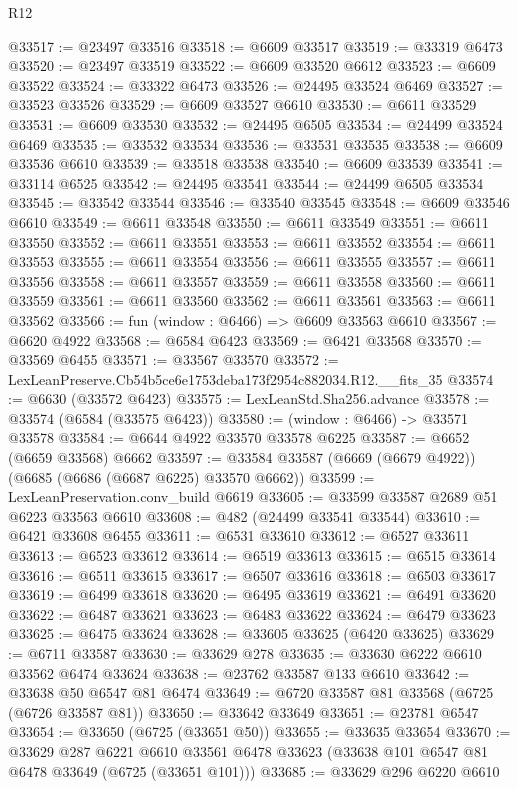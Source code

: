 \begin{lexlean}{R12}
\begin{coremodule}
@33517 := @23497 @33516
@33518 := @6609 @33517
@33519 := @33319 @6473
@33520 := @23497 @33519
@33522 := @6609 @33520 @6612
@33523 := @6609 @33522
@33524 := @33322 @6473
@33526 := @24495 @33524 @6469
@33527 := @33523 @33526
@33529 := @6609 @33527 @6610
@33530 := @6611 @33529
@33531 := @6609 @33530
@33532 := @24495 @6505
@33534 := @24499 @33524 @6469
@33535 := @33532 @33534
@33536 := @33531 @33535
@33538 := @6609 @33536 @6610
@33539 := @33518 @33538
@33540 := @6609 @33539
@33541 := @33114 @6525
@33542 := @24495 @33541
@33544 := @24499 @6505 @33534
@33545 := @33542 @33544
@33546 := @33540 @33545
@33548 := @6609 @33546 @6610
@33549 := @6611 @33548
@33550 := @6611 @33549
@33551 := @6611 @33550
@33552 := @6611 @33551
@33553 := @6611 @33552
@33554 := @6611 @33553
@33555 := @6611 @33554
@33556 := @6611 @33555
@33557 := @6611 @33556
@33558 := @6611 @33557
@33559 := @6611 @33558
@33560 := @6611 @33559
@33561 := @6611 @33560
@33562 := @6611 @33561
@33563 := @6611 @33562
@33566 := fun (window : @6466) => @6609 @33563 @6610
@33567 := @6620 @4922
@33568 := @6584 @6423
@33569 := @6421 @33568
@33570 := @33569 @6455
@33571 := @33567 @33570
@33572 := LexLeanPreserve.Cb54b5ce6e1753deba173f2954c882034.R12.__fits_35
@33574 := @6630 (@33572 @6423)
@33575 := LexLeanStd.Sha256.advance
@33578 := @33574 (@6584 (@33575 @6423))
@33580 := (window : @6466) -> @33571 @33578
@33584 := @6644 @4922 @33570 @33578 @6225
@33587 := @6652 (@6659 @33568) @6662
@33597 := @33584 @33587 (@6669 (@6679 @4922)) (@6685 (@6686 (@6687 @6225) @33570 @6662))
@33599 := LexLeanPreservation.conv_build @6619
@33605 := @33599 @33587 @2689 @51 @6223 @33563 @6610
@33608 := @482 (@24499 @33541 @33544)
@33610 := @6421 @33608 @6455
@33611 := @6531 @33610
@33612 := @6527 @33611
@33613 := @6523 @33612
@33614 := @6519 @33613
@33615 := @6515 @33614
@33616 := @6511 @33615
@33617 := @6507 @33616
@33618 := @6503 @33617
@33619 := @6499 @33618
@33620 := @6495 @33619
@33621 := @6491 @33620
@33622 := @6487 @33621
@33623 := @6483 @33622
@33624 := @6479 @33623
@33625 := @6475 @33624
@33628 := @33605 @33625 (@6420 @33625)
@33629 := @6711 @33587
@33630 := @33629 @278
@33635 := @33630 @6222 @6610 @33562 @6474 @33624
@33638 := @23762 @33587 @133 @6610
@33642 := @33638 @50 @6547 @81 @6474
@33649 := @6720 @33587 @81 @33568 (@6725 (@6726 @33587 @81))
@33650 := @33642 @33649
@33651 := @23781 @6547
@33654 := @33650 (@6725 (@33651 @50))
@33655 := @33635 @33654
@33670 := @33629
    @287
    @6221
    @6610
    @33561
    @6478
    @33623
    (@33638 @101 @6547 @81 @6478 @33649 (@6725 (@33651 @101)))
@33685 := @33629
    @296
    @6220
    @6610

\end{coremodule}
\end{lexlean}

